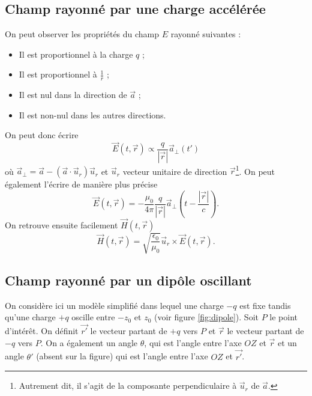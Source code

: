\subsection{Champ rayonné par une charge accélérée}
On peut observer les propriétés du champ $E$ rayonné suivantes :
\begin{itemize}
	\item Il est proportionnel à la charge $q$ ;
	\item Il est proportionnel à $\frac{1}{r}$ ;
	\item Il est nul dans la direction de $\vec{a}$ ;
	\item Il est non-nul dans les autres directions.
\end{itemize}
On peut donc écrire 
\[\vec{E}(t,\vec{r}) \propto \frac{q}{|\vec{r}|}\vec{a}_\perp(t')\]
où $\vec{a}_\perp = \vec{a}-(\vec{a}\cdot\vec{u}_r)\vec{u}_r$ et
$\vec{u}_r$ vecteur unitaire de direction $\vec{r}$\footnote{Autrement
dit, il s'agit de la composante perpendiculaire à $\vec{u}_r$ de $\vec{a}$.}. 
On peut également l'écrire de manière plus précise
\[\vec{E}(t,\vec{r}) = -\frac{\mu_0}{4\pi}\frac{q}{|\vec{r}|}\vec{a}_\perp(t-\frac{|\vec{r}|}{c}).\]
On retrouve ensuite facilement $\vec{H}(t,\vec{r})$ 
\[\vec{H}(t,\vec{r}) = \sqrt{\frac{\epsilon_0}{\mu_0}}\vec{u}_r \times \vec{E}(t,\vec{r}).\]

\subsection{Champ rayonné par un dipôle oscillant}
On considère ici un modèle simplifié dans lequel une charge
$-q$ est fixe tandis qu'une charge $+q$ oscille entre $-z_0$
et $z_0$ (voir figure \ref{fig:dipole}). Soit $P$ le point
d'intérêt. On définit $\vec{r'}$ le vecteur partant de $+q$ 
vers $P$ et $\vec{r}$ le vecteur partant de $-q$ vers $P$.
On a également un angle $\theta$, qui est l'angle entre l'axe
$OZ$ et $\vec{r}$ et un angle $\theta'$ (absent sur la figure)
qui est l'angle entre l'axe $OZ$ et $\vec{r'}$.

